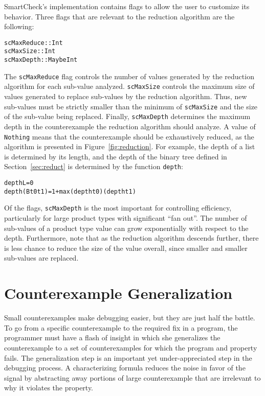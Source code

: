 \documentclass{sigplanconf}
\newenvironment{code}{\begin{alltt}\footnotesize}{\end{alltt}}
\newcommand{\ttp}[1]{\texttt{#1}}
\begin{document}
SmartCheck's implementation contains flags to allow the user to customize its
behavior.  Three flags that are relevant to the reduction algorithm are the
following:
%
\begin{code}
scMaxReduce :: Int
scMaxSize   :: Int
scMaxDepth  :: Maybe Int
\end{code}
%
\noindent
The \ttp{scMaxReduce} flag controls the number of values generated by the
reduction algorithm for each sub-value analyzed.  \ttp{scMaxSize} controls the
maximum size of values generated to replace sub-values by the reduction
algorithm.  Thus, new sub-values must be strictly smaller than the minimum of
\ttp{scMaxSize} and the size of the sub-value being replaced.  Finally,
\ttp{scMaxDepth} determines the maximum depth in the counterexample the
reduction algorithm should analyze.  A value of \ttp{Nothing} means that the
counterexample should be exhaustively reduced, as the algorithm is presented in
Figure~\ref{fig:reduction}.  For example, the depth of a list is determined by
its length, and the depth of the binary tree defined in Section~\ref{sec:reduct}
is determined by the function \ttp{depth}:
%
\begin{code}
depth L         = 0
depth (B t0 t1) = 1 + max (depth t0) (depth t1)
\end{code}
%
\noindent
Of the flags, \ttp{scMaxDepth} is the most important for controlling
efficiency, particularly for large product types with significant ``fan out''.
The number of sub-values of a product type value can grow exponentially with
respect to the depth.  Furthermore, note that as the reduction algorithm
descends further, there is less chance to reduce the size of the value overall,
since smaller and smaller sub-values are replaced.


\section{Counterexample Generalization}\label{sec:generalization}

Small counterexamples make debugging easier, but they are just half the battle.
To go from a specific counterexample to the required fix in a program, the
programmer must have a flash of insight in which she generalizes the
counterexample to a set of counterexamples for which the program and property
fails.  The generalization step is an important yet under-appreciated step in
the debugging process.  A characterizing formula reduces the noise in favor of
the signal by abstracting away portions of large counterexample that are
irrelevant to why it violates the property.
\end{document}
